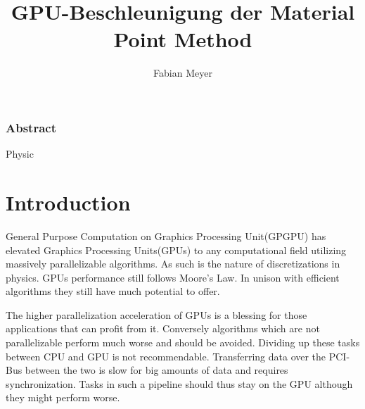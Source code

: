 \documentclass[m,times]{cgMA}
\begin{document}
\author{Fabian Meyer}
\title{GPU-Beschleunigung der Material Point Method}

\maketitle

\clearpage
{}
\subsubsection*{Abstract}

\noindent Physic


\clearpage
\tableofcontents

\clearpage         %
{}


\section{Introduction} \label{intro}
General Purpose Computation on Graphics Processing Unit(GPGPU) has elevated Graphics Processing Units(GPUs) to any computational field utilizing massively parallelizable algorithms. As such is the nature of discretizations in physics. GPUs performance still follows Moore's Law. In unison with efficient algorithms they still have much potential to offer.

The higher parallelization acceleration of GPUs is a blessing for those applications that can profit from it. Conversely algorithms which are not parallelizable perform much worse and should be avoided. Dividing up these tasks between CPU and GPU is not recommendable. Transferring data over the PCI-Bus between the two is slow for big amounts of data and requires synchronization. Tasks in such a pipeline should thus stay on the GPU although they might perform worse.
\end{document}
